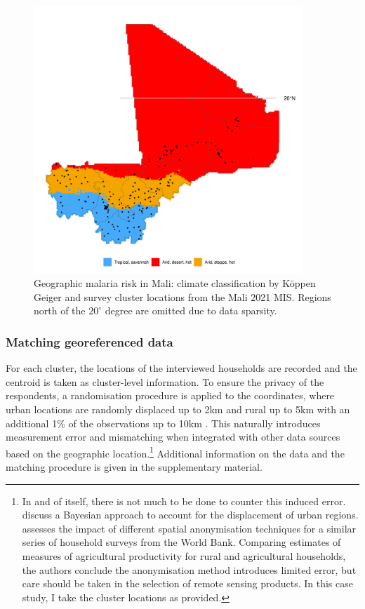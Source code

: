 \begin{figure}[!t]
	\centering
	\includegraphics[width=0.9\textwidth, keepaspectratio]{figures/mali_climatezones.png}
	\caption{Geographic malaria risk in Mali: climate classification by Köppen Geiger and survey cluster locations from the Mali 2021 MIS. Regions north of the $20^\circ$ degree are omitted due to data sparsity.}
	\label{fig:mli_climatezones}
\end{figure}


\subsubsection*{Matching georeferenced data}

For each cluster, the locations of the interviewed households are recorded and the centroid is taken as cluster-level information. To ensure the privacy of the respondents, a randomisation procedure is applied to the coordinates, where urban locations are randomly displaced up to 2km and rural up to 5km with an additional 1\% of the observations up to 10km \autocite{burgertGeographicDisplacementProcedure2013}. This naturally introduces measurement error and mismatching when integrated with other data sources based on the geographic location.\footnote{In and of itself, there is not much to be done to counter this induced error. \textcite{wuModelingUrbanRural2022} discuss a Bayesian approach to account for the displacement of urban regions. \textcite{michlerPrivacyProtectionMeasurement2022} assesses the impact of different spatial anonymisation techniques for a similar series of household surveys from the World Bank. Comparing estimates of measures of agricultural productivity for rural and agricultural households, the authors conclude the anonymisation method introduces limited error, but care should be taken in the selection of remote sensing products. In this case study, I take the cluster locations as provided.} Additional information on the data and the matching procedure is given in the supplementary material.


